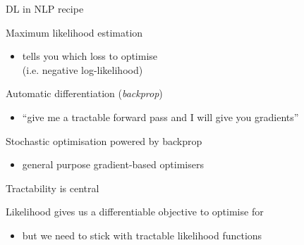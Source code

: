 \documentclass[14pt]{beamer}
\begin{document}
\begin{frame}{DL in NLP recipe}



	Maximum likelihood estimation
	\begin{itemize}
		\item  tells you which \alert{loss} to optimise \\
		(i.e. negative log-likelihood)
	\end{itemize}
	
	Automatic differentiation (\emph{backprop})
	\begin{itemize}
		\item ``give me a tractable forward pass and I will give you \alert{gradients}''
	\end{itemize}
	
	Stochastic optimisation powered by backprop
	\begin{itemize}
		\item general purpose gradient-based optimisers
	\end{itemize}

\end{frame}


\begin{frame}{Tractability is central}

Likelihood gives us a differentiable objective to optimise for
\begin{itemize}
	\item but we need to stick with \alert{tractable} likelihood functions
\end{itemize}




\end{frame}
\end{document}
